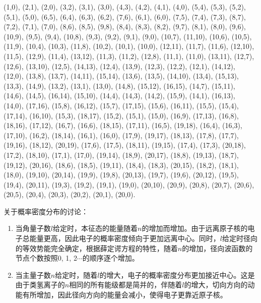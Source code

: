 \begin{enumerate}[label=\textbf{5.\arabic*}, listparindent=\parindent, leftmargin=-0.5mm]
\begin{small}
\noindent(1,0), (2,1), (2,0), (3,2), (3,1), (3,0), (4,3), (4,2), (4,1), (4,0), (5,4), (5,3), (5,2), (5,1), (5,0), (6,5), (6,4), (6,3), (6,2), (7,6), (6,1), (6,0), (7,5), (7,4), (7,3), (8,7), (7,2), (7,1), (7,0), (8,6), (8,5), (9,8), (8,4), (8,3), (8,2), (9,7), (8,1), (8,0), (9,6), (10,9), (9,5), (9,4), (10,8), (9,3), (9,2), (9,1), (9,0), (10,7), (11,10), (10,6), (10,5), (11,9), (10,4), (10,3), (11,8), (10,2), (10,1), (10,0), (12,11), (11,7), (11,6), (12,10), (11,5), (12,9), (11,4), (13,12), (11,3), (11,2), (12,8), (11,1), (11,0), (13,11), (12,7), (12,6), (13,10), (12,5), (14,13), (12,4), (13,9), (12,3), (12,2), (12,1), (14,12), (12,0), (13,8), (13,7), (14,11), (15,14), (13,6), (13,5), (14,10), (13,4), (15,13), (13,3), (14,9), (13,2), (13,1), (13,0), (14,8), (15,12), (16,15), (14,7), (15,11), (14,6), (14,5), (16,14), (15,10), (14,4), (14,3), (14,2), (15,9), (14,1), (16,13), (14,0), (17,16), (15,8), (16,12), (15,7), (17,15), (15,6), (16,11), (15,5), (15,4), (17,14), (16,10), (15,3), (18,17), (15,2), (15,1), (15,0), (16,9), (17,13), (16,8), (18,16), (17,12), (16,7), (16,6), (18,15), (17,11), (16,5), (19,18), (16,4), (16,3), (17,10), (16,2), (18,14), (16,1), (16,0), (17,9), (19,17), (18,13), (17,8), (17,7), (19,16), (18,12), (20,19), (17,6), (17,5), (18,11), (19,15), (17,4), (17,3), (20,18), (17,2), (18,10), (17,1), (17,0), (19,14), (18,9), (20,17), (18,8), (19,13), (18,7), (19,12), (20,16), (18,6), (18,5), (19,11), (18,4), (18,3), (20,15), (18,2), (18,1), (18,0), (19,10), (20,14), (19,9), (19,8), (20,13), (19,7), (19,6), (20,12), (19,5), (19,4), (20,11), (19,3), (19,2), (19,1), (19,0), (20,10), (20,9), (20,8), (20,7), (20,6), (20,5), (20,4), (20,3), (20,2), (20,1), (20,0).
\end{small}

关于概率密度分布的讨论：
\begin{enumerate}
    \item 当角量子数$l$给定时，本征态的能量随着$n$的增加而增加。由于远离原子核的电子总能量更高，因此电子的概率密度倾向于更加远离中心。同时，$l$给定时径向的等效势能完全确定，根据薛定谔方程的特性，随着$n$的增加，径向波函数的节点个数按照0, 1, 2$\cdots$的顺序逐个增加。
    \item 当主量子数$n$给定时，随着$l$的增大，电子的概率密度分布更加接近中心。这是由于类氢离子的$n$相同的所有能级都是简并的，伴随着$l$的增大，切向方向的动能有所增加，因此径向方向的能量会减小，使得电子更靠近原子核。
\end{enumerate}


\end{enumerate}
